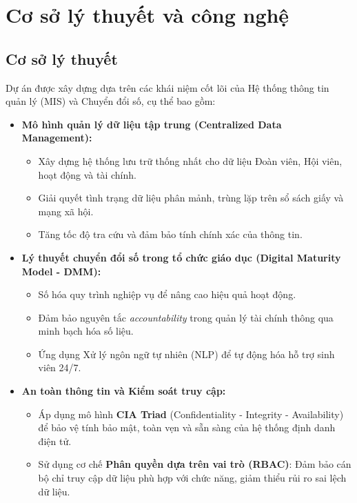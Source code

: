 \section{Cơ sở lý thuyết và công nghệ}

\subsection{Cơ sở lý thuyết} Dự án được xây dựng dựa trên các khái niệm cốt lõi của Hệ thống thông tin quản lý (MIS) và Chuyển đổi số, cụ thể bao gồm:

\begin{itemize} \item \textbf{Mô hình quản lý dữ liệu tập trung (Centralized Data Management):} \begin{itemize} \item Xây dựng hệ thống lưu trữ thống nhất cho dữ liệu Đoàn viên, Hội viên, hoạt động và tài chính. \item Giải quyết tình trạng dữ liệu phân mảnh, trùng lặp trên sổ sách giấy và mạng xã hội. \item Tăng tốc độ tra cứu và đảm bảo tính chính xác của thông tin. \end{itemize}

\item \textbf{Lý thuyết chuyển đổi số trong tổ chức giáo dục (Digital Maturity Model - DMM):}
\begin{itemize}
    \item Số hóa quy trình nghiệp vụ để nâng cao hiệu quả hoạt động.
    \item Đảm bảo nguyên tắc \textit{accountability} trong quản lý tài chính thông qua minh bạch hóa số liệu.
    \item Ứng dụng Xử lý ngôn ngữ tự nhiên (NLP) để tự động hóa hỗ trợ sinh viên 24/7.
\end{itemize}

\item \textbf{An toàn thông tin và Kiểm soát truy cập:}
\begin{itemize}
    \item Áp dụng mô hình \textbf{CIA Triad} (Confidentiality - Integrity - Availability) để bảo vệ tính bảo mật, toàn vẹn và sẵn sàng của hệ thống định danh điện tử.
    \item Sử dụng cơ chế \textbf{Phân quyền dựa trên vai trò (RBAC)}: Đảm bảo cán bộ chỉ truy cập dữ liệu phù hợp với chức năng, giảm thiểu rủi ro sai lệch dữ liệu.
\end{itemize}
\end{itemize}

